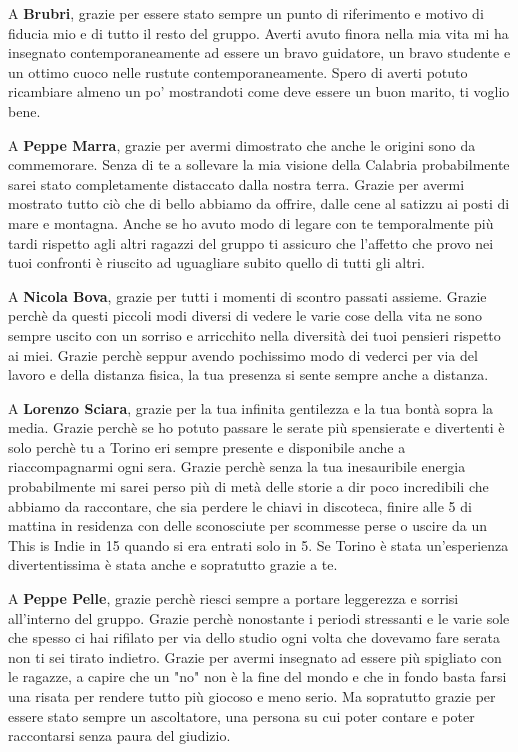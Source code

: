 \documentclass[cucitura%
,12pt%
]{toptesi}
\begin{document}
A \textbf{Brubri}, grazie per essere stato sempre un punto di riferimento e motivo di fiducia mio e di tutto il resto del gruppo. Averti avuto finora nella mia vita mi ha insegnato contemporaneamente ad essere un bravo guidatore,
un bravo studente e un ottimo cuoco nelle rustute contemporaneamente. Spero di averti potuto ricambiare almeno un po’ mostrandoti come deve essere un buon marito, ti voglio bene.

A \textbf{Peppe Marra}, grazie per avermi dimostrato che anche le origini sono da commemorare. Senza di te a sollevare la mia visione della Calabria probabilmente sarei stato completamente distaccato dalla nostra terra. Grazie per
avermi mostrato tutto ciò che di bello abbiamo da offrire, dalle cene al satizzu ai posti di mare e montagna. Anche se ho avuto modo di legare con te temporalmente più tardi rispetto agli altri ragazzi del gruppo ti assicuro che l'affetto
che provo nei tuoi confronti è riuscito ad uguagliare subito quello di tutti gli altri.

A \textbf{Nicola Bova}, grazie per tutti i momenti di scontro passati assieme. Grazie perchè da questi piccoli modi diversi di vedere le varie cose della vita ne sono sempre uscito con un sorriso e arricchito nella diversità dei tuoi pensieri rispetto ai miei.
Grazie perchè seppur avendo pochissimo modo di vederci per via del lavoro e della distanza fisica, la tua presenza si sente sempre anche a distanza.


A \textbf{Lorenzo Sciara}, grazie per la tua infinita gentilezza e la tua bontà sopra la media. Grazie perchè se ho potuto passare le serate più spensierate e divertenti è solo perchè tu a Torino eri sempre presente e disponibile anche a riaccompagnarmi ogni sera. Grazie perchè senza 
la tua inesauribile energia probabilmente mi sarei perso più di metà delle storie a dir poco incredibili che abbiamo da raccontare, che sia perdere le chiavi in discoteca, finire alle 5 di mattina in residenza con delle sconosciute per scommesse perse o uscire da un This is Indie in 15 quando si era entrati solo in 5.
Se Torino è stata un'esperienza divertentissima è stata anche e sopratutto grazie a te.

A \textbf{Peppe Pelle}, grazie perchè riesci sempre a portare  leggerezza e sorrisi all'interno del gruppo. Grazie perchè nonostante i periodi stressanti e le varie sole che spesso ci hai rifilato per via dello studio ogni volta che dovevamo fare serata non ti sei tirato indietro. Grazie per avermi insegnato ad essere più
spigliato con le ragazze, a capire che un "no" non è la fine del mondo e che in fondo basta farsi una risata per rendere tutto più giocoso e meno serio. Ma sopratutto grazie per essere stato sempre un ascoltatore, una persona su cui poter contare e poter raccontarsi senza paura del giudizio.
\end{document}
